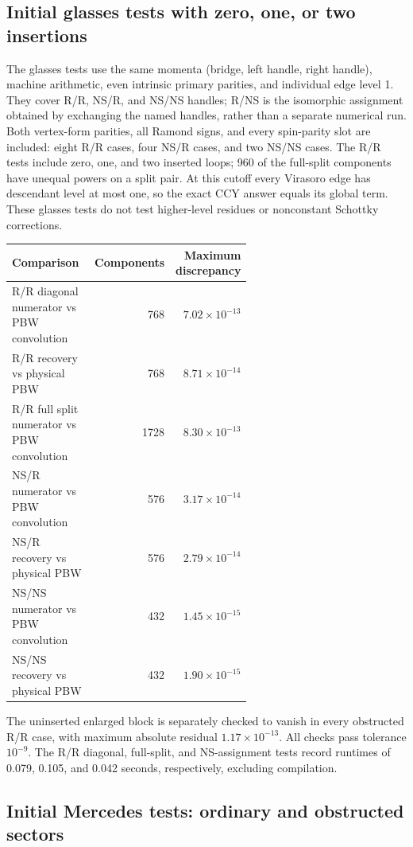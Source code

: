\documentclass[11pt]{article}
\numberwithin{equation}{section}
\begin{document}
\subsection{Initial glasses tests with zero, one, or two insertions}

The glasses tests use the same momenta (bridge, left handle, right handle),
machine arithmetic, even intrinsic primary parities, and individual edge
level 1. They cover R/R, NS/R,
and NS/NS handles; R/NS is the isomorphic assignment obtained by exchanging
the named handles, rather than a separate numerical run.
Both vertex-form parities, all Ramond signs, and every spin-parity slot
are included: eight R/R cases, four NS/R cases, and two NS/NS cases.
The R/R tests include zero, one, and two inserted loops;
960 of the full-split components have unequal powers on a split pair.
At this cutoff every Virasoro edge has descendant level at most one, so
the exact CCY answer equals its global term. These glasses tests do not
test higher-level residues or nonconstant Schottky corrections.

\begin{center}
\small
\begin{tabular}{@{}p{0.60\linewidth}rr@{}}
\toprule
Comparison & Components & Maximum discrepancy\\
\midrule
R/R diagonal numerator vs PBW convolution & 768 & $7.02\times10^{-13}$\\
R/R recovery vs physical PBW & 768 & $8.71\times10^{-14}$\\
R/R full split numerator vs PBW convolution & 1728 & $8.30\times10^{-13}$\\
NS/R numerator vs PBW convolution & 576 & $3.17\times10^{-14}$\\
NS/R recovery vs physical PBW & 576 & $2.79\times10^{-14}$\\
NS/NS numerator vs PBW convolution & 432 & $1.45\times10^{-15}$\\
NS/NS recovery vs physical PBW & 432 & $1.90\times10^{-15}$\\
\bottomrule
\end{tabular}
\end{center}
The uninserted enlarged block is separately checked to vanish in every
obstructed R/R case, with maximum absolute residual
$1.17\times10^{-13}$. All checks pass tolerance $10^{-9}$.
The R/R diagonal, full-split, and NS-assignment tests record runtimes of
0.079, 0.105, and 0.042 seconds, respectively, excluding compilation.

\subsection{Initial Mercedes tests: ordinary and obstructed sectors}
\end{document}
